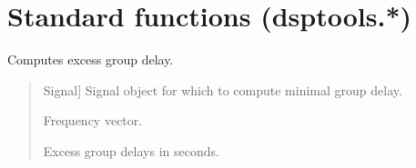 \documentclass[letterpaper,10pt,english]{sphinxmanual}
\begin{document}
\sphinxstepscope


\section{Standard functions (dsptools.*)}
\label{\detokenize{modules/dsptools.standard_functions:module-dsptools.standard_functions}}\label{\detokenize{modules/dsptools.standard_functions:standard-functions-dsptools}}\label{\detokenize{modules/dsptools.standard_functions::doc}}

\begin{fulllineitems}
\label{\detokenize{modules/dsptools.standard_functions:dsptools.standard_functions.excess_group_delay}}
\pysigstartsignatures
{}
\pysigstopsignatures
\sphinxAtStartPar
Computes excess group delay.
\begin{quote}\begin{description}
\begin{description}
\sphinxlineitem{\sphinxstylestrong{signal}}{[}Signal{]}
\sphinxAtStartPar
Signal object for which to compute minimal group delay.

\end{description}

\begin{description}
\sphinxlineitem{\sphinxstylestrong{f}}{[}\sphinxtitleref{np.ndarray}{]}
\sphinxAtStartPar
Frequency vector.

\sphinxlineitem{\sphinxstylestrong{ex\_gd}}{[}\sphinxtitleref{np.ndarray}{]}
\sphinxAtStartPar
Excess group delays in seconds.

\end{description}

\end{description}\end{quote}

\end{fulllineitems}
\end{document}
